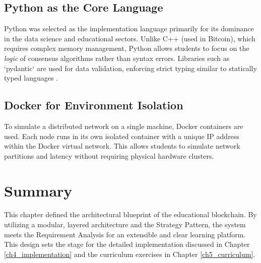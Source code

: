 \subsection{Python as the Core Language}
Python was selected as the implementation language primarily for its dominance in the data science and educational sectors. Unlike C++ (used in Bitcoin), which requires complex memory management, Python allows students to focus on the \textit{logic} of consensus algorithms rather than syntax errors. Libraries such as `pydantic` are used for data validation, enforcing strict typing similar to statically typed languages \cite{van1995python}.

\subsection{Docker for Environment Isolation}
To simulate a distributed network on a single machine, Docker containers are used. Each node runs in its own isolated container with a unique IP address within the Docker virtual network. This allows students to simulate network partitions and latency without requiring physical hardware clusters.

\section{Summary}
This chapter defined the architectural blueprint of the educational blockchain. By utilizing a modular, layered architecture and the Strategy Pattern, the system meets the Requirement Analysis for an extensible and clear learning platform. This design sets the stage for the detailed implementation discussed in Chapter \ref{ch4_implementation} and the curriculum exercises in Chapter \ref{ch5_curriculum}.